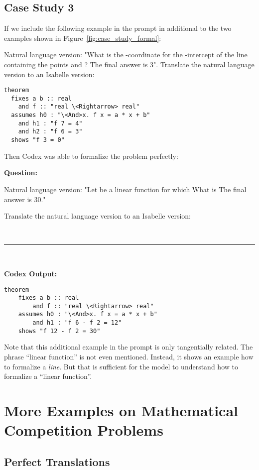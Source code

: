 \documentclass{article}
\begin{document}
\newpage
\subsection{Case Study 3}
\label{appendix:case_study_3}

If we include the following example in the prompt in additional to the two examples shown in Figure~\ref{fig:case_study_formal}:
\begin{boxB}
Natural language version: "What is the -coordinate for the -intercept of the line containing the points  and ? The final answer is 3".
Translate the natural language version to an Isabelle version:

\begin{lstlisting}
theorem
  fixes a b :: real
    and f :: "real \<Rightarrow> real"
  assumes h0 : "\<And>x. f x = a * x + b"
    and h1 : "f 7 = 4"
    and h2 : "f 6 = 3"
  shows "f 3 = 0"
\end{lstlisting}
\end{boxB}

Then Codex was able to formalize the problem perfectly:
\begin{boxB}
\textbf{Question:}

Natural language version:
"Let  be a linear function for which  What is  The final answer is 30."

Translate the natural language version to an Isabelle version:

\
\hrule
\

\textbf{Codex Output:}

\begin{lstlisting}
theorem
    fixes a b :: real
        and f :: "real \<Rightarrow> real"
    assumes h0 : "\<And>x. f x = a * x + b"
        and h1 : "f 6 - f 2 = 12"
    shows "f 12 - f 2 = 30"
\end{lstlisting}
\end{boxB}
Note that this additional example in the prompt is only tangentially related. The phrase ``linear function'' is not even mentioned. Instead, it shows an example how to formalize a \emph{line}. But that is sufficient for the model to understand how to formalize a ``linear function''.




\section{More Examples on Mathematical Competition Problems}

\subsection{Perfect Translations}
\end{document}
